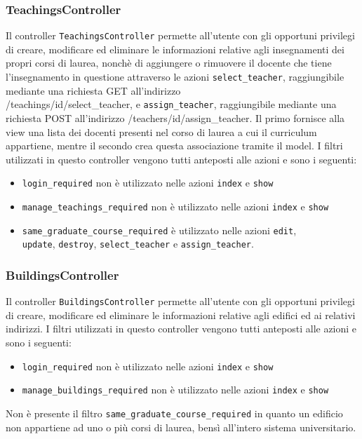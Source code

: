 \documentclass[11pt,a4paper]{article}
\begin{document}
\subsubsection{TeachingsController}
Il controller \verb|TeachingsController| permette all'utente con gli opportuni privilegi di creare, modificare ed eliminare le informazioni relative agli insegnamenti dei propri corsi di laurea, nonchè di aggiungere o rimuovere il docente che tiene l'insegnamento in questione attraverso le azioni \verb|select_teacher|, raggiungibile mediante una richiesta GET all'indirizzo \\ /teachings/id/select\_teacher, e \verb|assign_teacher|, raggiungibile mediante una richiesta POST all'indirizzo /teachers/id/assign\_teacher. Il primo fornisce alla view una lista dei docenti presenti nel corso di laurea a cui il curriculum appartiene, mentre il secondo crea questa associazione tramite il model.
I filtri utilizzati in questo controller vengono tutti anteposti alle azioni e sono i seguenti:
\begin{itemize}
 \item \verb|login_required| non è utilizzato nelle azioni \verb|index| e \verb|show|
 \item \verb|manage_teachings_required| non è utilizzato nelle azioni \verb|index| e \verb|show|
 \item \verb|same_graduate_course_required| è utilizzato nelle azioni \verb|edit|,\\ \verb|update|, \verb|destroy|, \verb|select_teacher| e \verb|assign_teacher|.
\end{itemize}
\subsubsection{BuildingsController}
Il controller \verb|BuildingsController| permette all'utente con gli opportuni privilegi di creare, modificare ed eliminare le informazioni relative agli edifici ed ai relativi indirizzi.
I filtri utilizzati in questo controller vengono tutti anteposti alle azioni e sono i seguenti:
\begin{itemize}
 \item \verb|login_required| non è utilizzato nelle azioni \verb|index| e \verb|show|
 \item \verb|manage_buildings_required| non è utilizzato nelle azioni \verb|index| e \verb|show|
\end{itemize}
Non è presente il filtro \verb|same_graduate_course_required| in quanto un edificio non appartiene ad uno o più corsi di laurea, bensì all'intero sistema universitario.
\end{document}
